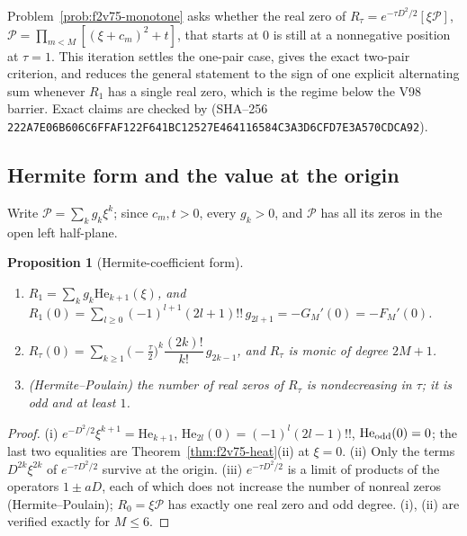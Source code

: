\documentclass[11pt]{article}
\newtheorem{proposition}[theorem]{Proposition}
\theoremstyle{definition}
\theoremstyle{remark}
\begin{document}
Problem~\ref{prob:f2v75-monotone} asks whether the real zero of
\(R_\tau=e^{-\tau D^2/2}[\xi\mathcal P]\), \(\mathcal P=\prod_{m<M}[(\xi+c_m)^2+t]\),
that starts at \(0\) is still at a nonnegative position at \(\tau=1\).
This iteration settles the one-pair case, gives the exact two-pair
criterion, and reduces the general statement to the sign of one explicit
alternating sum whenever \(R_1\) has a single real zero, which is the
regime below the V98 barrier.  Exact claims are checked by
 (SHA--256
\texttt{222A7E06B606C6FFAF122F641BC12527}\allowbreak\texttt{E464116584C3A3D6CFD7E3A570CDCA92}).

\subsection{Hermite form and the value at the origin}

Write \(\mathcal P=\sum_kg_k\xi^k\); since \(c_m,t>0\), every \(g_k>0\),
and \(\mathcal P\) has all its zeros in the open left half-plane.

\begin{proposition}[Hermite-coefficient form]
\label{prop:f2v76-hermite}
\begin{enumerate}[label=\textup{(\roman*)}]
\item \(R_1=\sum_kg_k\mathrm{He}_{k+1}(\xi)\), and
\(R_1(0)=\sum_{l\ge0}(-1)^{l+1}(2l+1)!!\,g_{2l+1}=-G_M'(0)=-F_M'(0)\).
\item \(R_\tau(0)=\sum_{k\ge1}\bigl(-\tfrac\tau2\bigr)^k\dfrac{(2k)!}{k!}\,g_{2k-1}\),
and \(R_\tau\) is monic of degree \(2M+1\).
\item (Hermite--Poulain) the number of real zeros of \(R_\tau\) is
nondecreasing in \(\tau\); it is odd and at least \(1\).
\end{enumerate}
\end{proposition}

\begin{proof}
(i) \(e^{-D^2/2}\xi^{k+1}=\mathrm{He}_{k+1}\), \(\mathrm{He}_{2l}(0)=(-1)^l(2l-1)!!\),
\(\mathrm{He}_{\rm odd}(0)=0\); the last two equalities are
Theorem~\ref{thm:f2v75-heat}(ii) at \(\xi=0\).  (ii) Only the terms
\(D^{2k}\xi^{2k}\) of \(e^{-\tau D^2/2}\) survive at the origin.  (iii)
\(e^{-\tau D^2/2}\) is a limit of products of the operators
\(1\pm aD\), each of which does not increase the number of nonreal zeros
(Hermite--Poulain); \(R_0=\xi\mathcal P\) has exactly one real zero and
odd degree.  (i), (ii) are verified exactly for \(M\le6\).
\end{proof}
\end{document}
